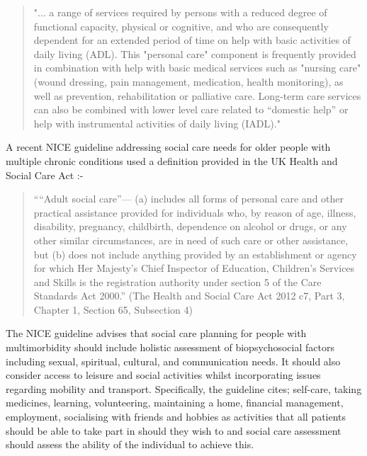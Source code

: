 \documentclass[12pt,]{report}
\begin{document}
\begin{quotation}
"... a range of services required by persons with a reduced degree of functional capacity, physical or cognitive, and who are consequently dependent for an extended period of time on help with basic activities of daily living (ADL). This "personal care" component is frequently provided in combination with help with basic medical services such as "nursing care" (wound dressing, pain management, medication, health monitoring), as well as prevention, rehabilitation or palliative care. Long-term care services can also be combined with lower level care related to “domestic help” or help with instrumental activities of daily living (IADL)." 
\end{quotation}

\citep[pp38]{RN406}

A recent NICE guideline \citeyearpar{RN150} addressing social care needs
for older people with multiple chronic conditions used a definition
provided in the UK Health and Social Care Act \citeyearpar{RN149}:-

\begin{quotation}
    ““Adult social care”—
    (a) includes all forms of personal care and other practical assistance provided for individuals who, by reason of age, illness, disability, pregnancy, childbirth, dependence on alcohol or drugs, or any other similar circumstances, are in need of such care or other assistance, but 
    (b) does not include anything provided by an establishment or agency for which Her Majesty’s Chief Inspector of Education, Children’s Services and Skills is the registration authority under section 5 of the Care Standards Act 2000.”
    (The Health and Social Care Act  2012 c7, Part 3, Chapter 1, Section 65, Subsection 4)
\end{quotation}

The NICE guideline \citeyearpar{RN150} advises that social care planning
for people with multimorbidity should include holistic assessment of
biopsychosocial factors including sexual, spiritual, cultural, and
communication needs. It should also consider access to leisure and
social activities whilst incorporating issues regarding mobility and
transport. Specifically, the guideline cites; self-care, taking
medicines, learning, volunteering, maintaining a home, financial
management, employment, socialising with friends and hobbies as
activities that all patients should be able to take part in should they
wish to and social care assessment should assess the ability of the
individual to achieve this.
\end{document}
